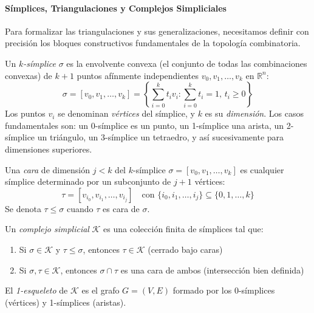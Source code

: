 \paragraph{Símplices, Triangulaciones y Complejos Simpliciales}

Para formalizar las triangulaciones y sus generalizaciones, necesitamos definir con precisión los bloques constructivos fundamentales de la topología combinatoria.

\begin{definition}[$k$-símplice]\label{def:simplicio_gdl}
	Un \textit{$k$-símplice} $\sigma$ es la envolvente convexa (el conjunto de todas las combinaciones convexas) de $k+1$ puntos afínmente independientes $v_0, v_1, \ldots, v_k$ en $\mathbb{R}^n$:
	\[
		\sigma = [v_0, v_1, \ldots, v_k] = \left\{ \sum_{i=0}^k t_i v_i : \sum_{i=0}^k t_i = 1, \, t_i \geq 0 \right\}
	\]
	Los puntos $v_i$ se denominan \textit{vértices} del símplice, y $k$ es su \textit{dimensión}. Los casos fundamentales son: un 0-símplice es un punto, un 1-símplice una arista, un 2-símplice un triángulo, un 3-símplice un tetraedro, y así sucesivamente para dimensiones superiores.
\end{definition}

\begin{definition}\label{def:cara_simplicio_gdl}
	Una \textit{cara} de dimensión $j < k$ del $k$-símplice $\sigma = [v_0, v_1, \ldots, v_k]$ es cualquier símplice determinado por un subconjunto de $j+1$ vértices:
	\[
		\tau = [v_{i_0}, v_{i_1}, \ldots, v_{i_j}] \quad \text{con } \{i_0, i_1, \ldots, i_j\} \subseteq \{0, 1, \ldots, k\}
	\]
	Se denota $\tau \leq \sigma$ cuando $\tau$ es cara de $\sigma$.
\end{definition}

\begin{definition}\label{def:complejo_simplicial}
	Un \textit{complejo simplicial} $\mathcal{K}$ es una colección finita de símplices tal que:
	\begin{enumerate}
		\item Si $\sigma \in \mathcal{K}$ y $\tau \leq \sigma$, entonces $\tau \in \mathcal{K}$ (cerrado bajo caras)
		\item Si $\sigma, \tau \in \mathcal{K}$, entonces $\sigma \cap \tau$ es una cara de ambos (intersección bien definida)
	\end{enumerate}

	El \textit{1-esqueleto} de $\mathcal{K}$ es el grafo $G = (V,E)$ formado por los 0-símplices (vértices) y 1-símplices (aristas).
\end{definition}

